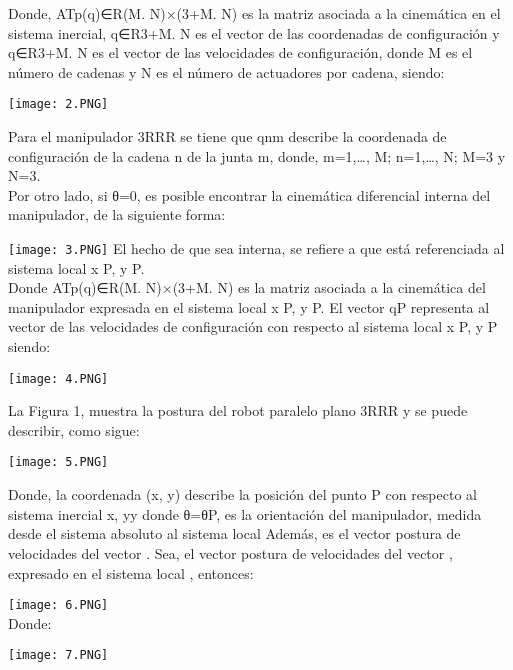 \documentclass[12pt,letterpaper]{report}
\begin{document}
\begin{center}
\begin{flushleft}
\begin{flushleft}
\begin{flushleft}
\begin{center}
\begin{flushleft}
\begin{flushleft}
Donde, ATp(q)∈R(M.
N)×(3+M.
N)
 es la matriz asociada a la cinemática en el sistema inercial, q∈R3+M.
N es el vector de las
coordenadas de configuración y q∈R3+M.
N es el vector de las
velocidades de configuración, donde M es el número de cadenas y N es el número de actuadores por cadena, siendo:\\
\begin{center}
\texttt{[image: 2.PNG]} 
\begin{flushleft}
Para el manipulador 3RRR se tiene que qnm describe la coordenada de configuración de la cadena n de la junta m, donde,
m=1,…, M; n=1,…, N; M=3 y N=3.\\
Por otro lado, si θ=0, es posible encontrar la cinemática
diferencial interna del manipulador, de la siguiente forma:\\
\begin{center}
\texttt{[image: 3.PNG]} 
El hecho de que sea interna, se refiere a que está referenciada al sistema local {x P, y P}.\\
Donde ATp(q)∈R(M.
N)×(3+M.
N)
 es la matriz asociada a la cinemática del manipulador expresada en el sistema local {x P, y P}.
El vector qP representa al vector de las velocidades de configuración con respecto al sistema local {x P, y P} siendo:\\
\begin{center}
\texttt{[image: 4.PNG]} 
\begin{flushleft}
La Figura 1, muestra la postura del robot paralelo plano
3RRR y se puede describir, como sigue:
\begin{center}
\texttt{[image: 5.PNG]} 
\begin{flushleft}
Donde, la coordenada (x, y) describe la posición del punto
P con respecto al sistema inercial {x, y}y donde θ=θP, es la
orientación del manipulador, medida desde el sistema absoluto al sistema local Además, es el vector postura de velocidades del vector . Sea, el vector postura de velocidades del
vector , expresado en el sistema local , entonces:\\
\begin{flushleft}
\texttt{[image: 6.PNG]}\\
 Donde: 
 \begin{center}
 \texttt{[image: 7.PNG]} 
 

\end{center}
\end{flushleft}
\end{flushleft}
\end{center}
\end{flushleft}
\end{center}
\end{center}
\end{flushleft}
\end{center}
\end{flushleft}
\end{flushleft}
\end{center}
\end{flushleft}
\end{flushleft}
\end{flushleft}
\end{center}
\end{document}
